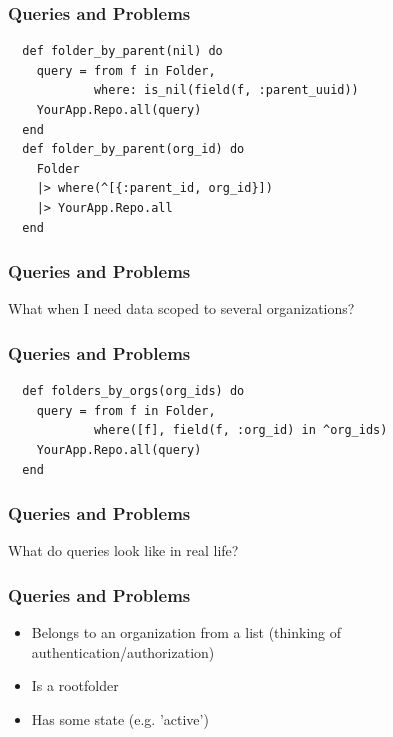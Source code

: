 \documentclass{beamer}
\begin{document}

\begin{frame}[fragile]
\frametitle{Queries and Problems}
\begin{verbatim}
  def folder_by_parent(nil) do
    query = from f in Folder,
            where: is_nil(field(f, :parent_uuid))
    YourApp.Repo.all(query)
  end
  def folder_by_parent(org_id) do
    Folder
    |> where(^[{:parent_id, org_id}])
    |> YourApp.Repo.all
  end
\end{verbatim}
\end{frame}


\begin{frame}[fragile]
\frametitle{Queries and Problems}
\centerline{What when I need data scoped to several organizations?}
\end{frame}


\begin{frame}[fragile]
\frametitle{Queries and Problems}
\begin{verbatim}
  def folders_by_orgs(org_ids) do
    query = from f in Folder,
            where([f], field(f, :org_id) in ^org_ids)
    YourApp.Repo.all(query)
  end
\end{verbatim}
\end{frame}


\begin{frame}[fragile]
\frametitle{Queries and Problems}
\centerline{What do queries look like in real life?}
\end{frame}


\begin{frame}[fragile]
\frametitle{Queries and Problems}
\begin{itemize}
\item Belongs to an organization from a list (thinking of authentication/authorization)
\item Is a rootfolder
\item Has some state (e.g. 'active')
\end{itemize}
\end{frame}

\end{document}

